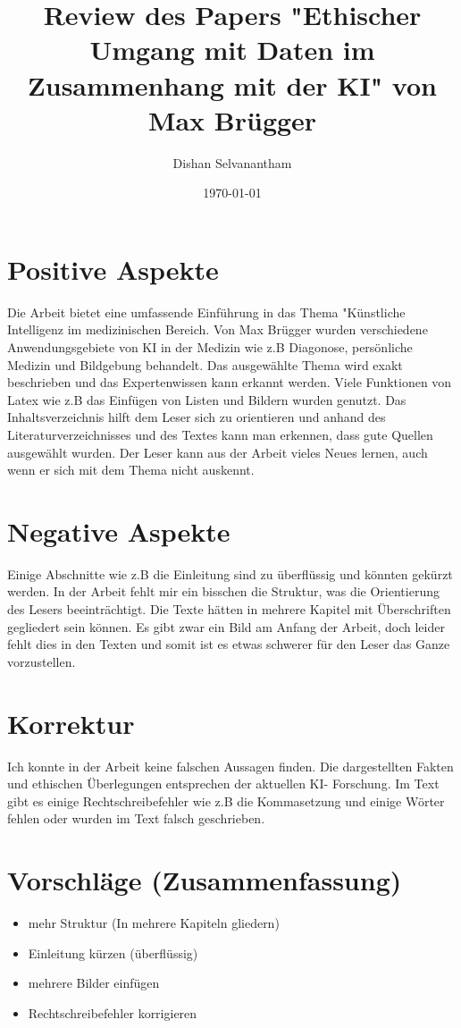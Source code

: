 \documentclass{article}
\title{Review des Papers "Ethischer Umgang mit Daten im Zusammenhang mit der KI" von Max Brügger}
\author{Dishan Selvanantham}
\date{\today}
\begin{document}
\maketitle


\section{Positive Aspekte}

Die Arbeit bietet eine umfassende Einführung in das Thema "Künstliche Intelligenz im medizinischen Bereich. Von Max Brügger wurden verschiedene Anwendungsgebiete von KI in der Medizin wie z.B Diagonose, persönliche Medizin und Bildgebung behandelt.
Das ausgewählte Thema wird exakt beschrieben und das Expertenwissen kann erkannt werden. Viele Funktionen von Latex wie z.B das Einfügen von Listen und Bildern wurden genutzt. Das Inhaltsverzeichnis hilft dem Leser sich zu orientieren und anhand des Literaturverzeichnisses und des Textes kann man erkennen, dass gute Quellen ausgewählt wurden. Der Leser kann aus der Arbeit vieles Neues lernen, auch wenn er sich mit dem Thema nicht auskennt.


\section{Negative Aspekte}


Einige Abschnitte wie z.B die Einleitung sind zu überflüssig und könnten gekürzt werden. In der Arbeit fehlt mir ein bisschen die Struktur, was die Orientierung des Lesers beeinträchtigt. Die Texte hätten in mehrere Kapitel mit Überschriften gegliedert sein können.
Es gibt zwar ein Bild am Anfang der Arbeit, doch leider fehlt dies in den Texten und somit ist es etwas schwerer für den Leser das Ganze vorzustellen. 

\section{Korrektur}

Ich konnte in der Arbeit keine falschen Aussagen finden. Die dargestellten Fakten und ethischen Überlegungen entsprechen der aktuellen KI- Forschung.
Im Text gibt es einige Rechtschreibefehler wie z.B die Kommasetzung und einige Wörter fehlen oder wurden im Text falsch geschrieben.

\section{Vorschläge (Zusammenfassung)}
\begin{itemize}
    \item mehr Struktur (In mehrere Kapiteln gliedern)
    \item Einleitung kürzen (überflüssig)
    \item mehrere Bilder einfügen
    \item Rechtschreibefehler korrigieren
  \end{itemize}

\printbibliography
\end{document}

